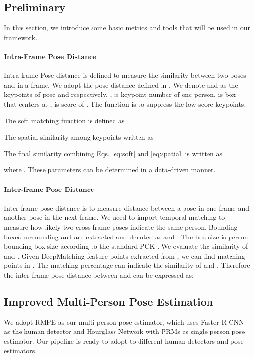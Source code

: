 \documentclass{bmvc2k}
\begin{document}
\subsection{Preliminary}
\vspace{-2mm}
In this section, we introduce some basic metrics and tools that will be used in our framework.
\vspace{-6mm}
\paragraph{Intra-Frame Pose Distance}
Intra-frame Pose distance is defined to measure the similarity between two poses  and  in a frame. We adopt the pose distance defined in  \cite{fang2017rmpe}. We denote  and  as the  keypoints of pose  and  respectively, ,  is keypoint number of one person,  is box that centers at ,  is score of . The  function is to suppress the low score keypoints. 

The soft matching function is defined as


The spatial similarity among keypoints written as


The final similarity combining Eqs. \ref{eq:soft} and \ref{eq:spatial} is written as


where . These parameters can be determined in a data-driven manner.
\vspace{-3mm}
\paragraph{Inter-frame Pose Distance}
Inter-frame pose distance is to measure distance between a pose  in one frame and another pose  in the next frame. We need to import temporal matching to measure how likely two cross-frame poses indicate the same person. Bounding boxes surrounding  and  are extracted and denoted as  and . The box size is  person bounding box size according to the standard PCK \cite{andriluka14cvpr}. We evaluate the similarity of  and . Given  DeepMatching feature \cite{revaud2016deepmatching} points extracted from , we can find  matching points in . The matching percentage  can indicate the similarity of  and . Therefore the inter-frame pose distance between  and  can be expressed as:


\subsection{Improved Multi-Person Pose Estimation}
We adopt RMPE \cite{fang2017rmpe} as our multi-person pose estimator, which uses Faster R-CNN\cite{ren2015faster} as the human detector and Hourglass Network with PRMs \cite{yang2017learning} as single person pose estimator. Our pipeline is ready to adopt to different human detectors and pose estimators.
\vspace{-3mm}
\end{document}
